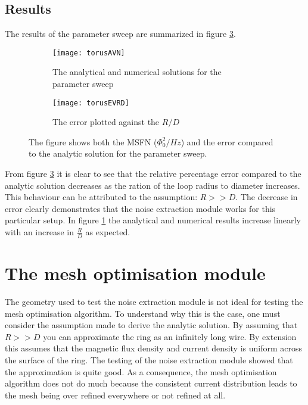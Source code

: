 \subsection{Results}

The results of the parameter sweep are summarized in figure \ref{fig:resTorus}.
\begin{figure}[H]
    \centering
    \begin{subfigure}[b]{0.48\textwidth}
        \centering
        \texttt{[image: torusAVN]}
        \caption{The analytical and numerical solutions for the parameter sweep}
        \label{fig:MSFNvRD}
    \end{subfigure}
    \hfill
    \begin{subfigure}[b]{0.48\textwidth}
        \centering
        \texttt{[image: torusEVRD]}
        \caption{The error plotted against the $R/D$}
        \label{fig:evRD}
    \end{subfigure}
    \caption{The figure shows both the MSFN ($\Phi_0^2 / Hz$) and the error compared to the analytic solution for the parameter sweep.}
    \label{fig:resTorus}
\end{figure}
From figure \ref{fig:resTorus} it is clear to see that the relative percentage error compared to the analytic solution decreases as the ration of the loop radius to diameter increases. This behaviour can be attributed to the assumption: $R >> D$. The decrease in error clearly demonstrates that the noise extraction module works for this particular setup. In figure \ref{fig:MSFNvRD} the analytical and numerical results increase linearly with an increase in $\frac{R}{D}$ as expected.

\section{The mesh optimisation module}
The geometry used to test the noise extraction module is not ideal for testing the mesh optimisation algorithm. To understand why this is the case, one must consider the assumption made to derive the analytic solution. By assuming that $R >> D$ you can approximate the ring as an infinitely long wire. By extension this assumes that the magnetic flux density and current density is uniform across the surface of the ring. The testing of the noise extraction module showed that the approximation is quite good. As a consequence, the mesh optimisation algorithm does not do much because the consistent current distribution leads to the mesh being over refined everywhere or not refined at all.
